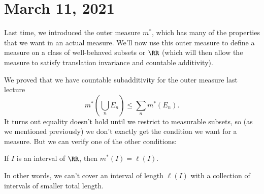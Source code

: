 
\pagebreak\section*{March 11, 2021}

Last time, we introduced the outer measure $m^\ast$, which has many of the properties that we want in an actual measure. We'll now use this outer measure to define a measure on a class of well-behaved subsets or $\RR$ (which will then allow the measure to satisfy translation invariance and countable additivity). 

We proved that we have countable subadditivity for the outer measure last lecture
\[
    m^\ast \left(\bigcup_{n} E_n \right) \le \sum_n m^\ast(E_n).
\]
It turns out equality doesn't hold until we restrict to measurable subsets, so (as we mentioned previously) we don't exactly get the condition we want for a measure. But we can verify one of the other conditions:

\begin{proposition}
If $I$ is an interval of $\RR$, then $m^\ast(I) = \ell(I)$.
\end{proposition}

In other words, we can't cover an interval of length $\ell(I)$ with a collection of intervals of smaller total length.

